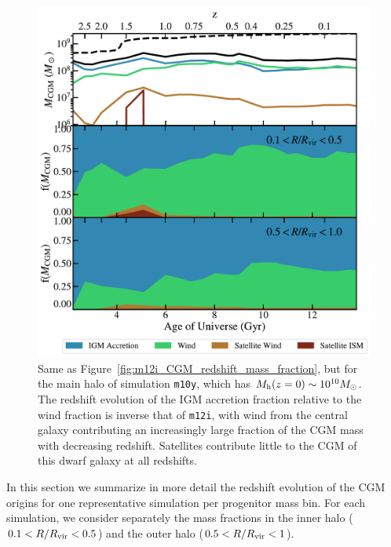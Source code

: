 \documentclass[fleqn,usenatbib]{mnras}
\begin{document}
\begin{figure}
\includegraphics[width=\columnwidth]{figures/m10y_CGM_redshift_mass_fraction_galdefv3}
\caption{
Same as Figure~\ref{fig:m12i_CGM_redshift_mass_fraction}, but for the main halo of simulation \texttt{m10y}, which has  $M_{\rm h} ( z=0 )\sim 10^{10} M_\odot$.
The redshift evolution of the IGM accretion fraction relative to the wind fraction is inverse that of \texttt{m12i}, with wind from the central galaxy contributing an increasingly large fraction of the CGM mass with decreasing redshift. 
Satellites contribute little to the CGM of this dwarf galaxy at all redshifts.
}
\label{fig:m10y_CGM_redshift_mass_fraction_galdefv2}
\end{figure}

In this section we summarize in more detail the redshift evolution of the CGM origins for one representative simulation per progenitor mass bin.
For each simulation, we consider separately the mass fractions in the inner halo ($0.1 < R / R_{\rm vir} < 0.5$) and the outer halo ($0.5 < R/R_{\rm vir} < 1$). 
\end{document}
